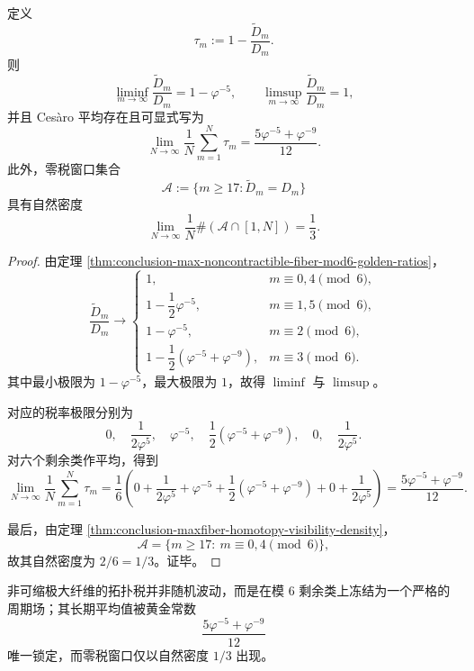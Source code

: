 \begin{theorem}\label{thm:conclusion-max-noncontractible-topological-tax-cesaro-density}
定义
\[
\tau_m:=1-\frac{\widetilde D_m}{D_m}.
\]
则
\[
\liminf_{m\to\infty}\frac{\widetilde D_m}{D_m}=1-\varphi^{-5},
\qquad
\limsup_{m\to\infty}\frac{\widetilde D_m}{D_m}=1,
\]
并且 Ces\`aro 平均存在且可显式写为
\[
\lim_{N\to\infty}\frac1N\sum_{m=1}^{N}\tau_m
=
\frac{5\varphi^{-5}+\varphi^{-9}}{12}.
\]
此外，零税窗口集合
\[
\mathcal A:=\{m\ge 17:\widetilde D_m=D_m\}
\]
具有自然密度
\[
\lim_{N\to\infty}\frac1N\#(\mathcal A\cap [1,N])=\frac13.
\]
\end{theorem}
\begin{proof}
由定理 \ref{thm:conclusion-max-noncontractible-fiber-mod6-golden-ratios}，
\[
\frac{\widetilde D_m}{D_m}\to
\begin{cases}
1,& m\equiv 0,4\pmod 6,\\[2pt]
1-\dfrac{1}{2}\varphi^{-5},& m\equiv 1,5\pmod 6,\\[6pt]
1-\varphi^{-5},& m\equiv 2\pmod 6,\\[4pt]
1-\dfrac12(\varphi^{-5}+\varphi^{-9}),& m\equiv 3\pmod 6.
\end{cases}
\]
其中最小极限为 \(1-\varphi^{-5}\)，最大极限为 \(1\)，故得 \(\liminf\) 与 \(\limsup\)。

对应的税率极限分别为
\[
0,\quad \frac1{2\varphi^5},\quad \varphi^{-5},\quad \frac12(\varphi^{-5}+\varphi^{-9}),\quad 0,\quad \frac1{2\varphi^5}.
\]
对六个剩余类作平均，得到
\[
\lim_{N\to\infty}\frac1N\sum_{m=1}^{N}\tau_m
=
\frac16\left(
0+\frac1{2\varphi^5}+\varphi^{-5}+\frac12(\varphi^{-5}+\varphi^{-9})+0+\frac1{2\varphi^5}
\right)
=
\frac{5\varphi^{-5}+\varphi^{-9}}{12}.
\]

最后，由定理 \ref{thm:conclusion-maxfiber-homotopy-visibility-density}，
\[
\mathcal A=\{m\ge 17:\ m\equiv 0,4\pmod 6\},
\]
故其自然密度为 \(2/6=1/3\)。证毕。
\end{proof}

\begin{corollary}\label{cor:conclusion-max-noncontractible-topological-tax-mod6-periodic-field}
非可缩极大纤维的拓扑税并非随机波动，而是在模 \(6\) 剩余类上冻结为一个严格的周期场；其长期平均值被黄金常数
\[
\frac{5\varphi^{-5}+\varphi^{-9}}{12}
\]
唯一锁定，而零税窗口仅以自然密度 \(1/3\) 出现。
\end{corollary}
